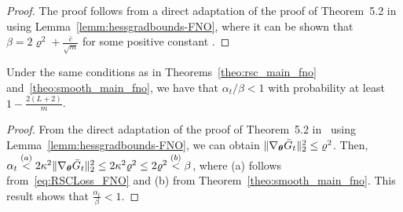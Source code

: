 \RSSFNO*
%
\begin{proof}
The proof follows from a direct adaptation of the proof of Theorem~5.2 in~\citep{banerjee2022restricted} using Lemma~\ref{lemm:hessgradbounds-FNO}, where it can be shown that $\beta = 2\varrho^2 + \frac{\bar{c}}{\sqrt{m}}$ for some positive constant .
\end{proof}

\begin{prop} 
\label{prop:RSC-smooth-FNO}
Under the same conditions as in Theorems~\ref{theo:rsc_main_fno} and~\ref{theo:smooth_main_fno}, we have that $\alpha_t/\beta<1$ with probability at least $1-\frac{2(L+2)}{m}$.
\end{prop}
\begin{proof}
From the direct adaptation of the proof of Theorem~5.2 in~\citep{banerjee2022restricted} using Lemma~\ref{lemm:hessgradbounds-FNO}, we can obtain $\lVert\nabla_{{\bm{\theta}}}\bar{G}_t\rVert_2^2\leq \varrho^2$. Then, $\alpha_t\overset{(a)}{<}2\kappa^2\lVert\nabla_{{\bm{\theta}}}\bar{G}_t\rVert_2^2\leq 2\kappa^2 \varrho^2\leq 2\varrho^2\overset{(b)}{<}
\beta$, where (a) follows from~\eqref{eq:RSCLoss_FNO} and (b) from Theorem~\ref{theo:smooth_main_fno}. This result shows that $\frac{\alpha_t}{\beta}<1$.
\end{proof}



